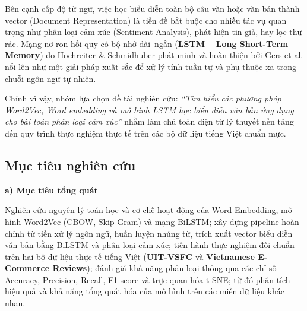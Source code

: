 \documentclass[12pt,a4paper]{article}
\begin{document}
Bên cạnh cấp độ từ ngữ, việc học biểu diễn toàn bộ câu văn hoặc văn bản thành vector (Document Representation) là tiền đề bắt buộc cho nhiều tác vụ quan trọng như phân loại cảm xúc (Sentiment Analysis), phát hiện tin giả, hay lọc thư rác. Mạng nơ-ron hồi quy có bộ nhớ dài--ngắn (\textbf{LSTM -- Long Short-Term Memory}) do Hochreiter \& Schmidhuber phát minh \cite{hochreiter1997lstm} và hoàn thiện bởi Gers et al. \cite{gers2000learning} nổi lên như một giải pháp xuất sắc để xử lý tính tuần tự và phụ thuộc xa trong chuỗi ngôn ngữ tự nhiên. 

Chính vì vậy, nhóm lựa chọn đề tài nghiên cứu: \textit{“Tìm hiểu các phương pháp Word2Vec, Word embedding và mô hình LSTM học biểu diễn văn bản ứng dụng cho bài toán phân loại cảm xúc”} nhằm làm chủ toàn diện từ lý thuyết nền tảng đến quy trình thực nghiệm thực tế trên các bộ dữ liệu tiếng Việt chuẩn mực.

\subsection{Mục tiêu nghiên cứu}\label{sec:muc_tieu_nghien_cuu}

\vspace{0.2cm}\label{sec:muc_tieu_tong_quat}\noindent\textbf{a) Mục tiêu tổng quát}\par
Nghiên cứu nguyên lý toán học và cơ chế hoạt động của Word Embedding, mô hình Word2Vec (CBOW, Skip-Gram) và mạng BiLSTM; xây dựng pipeline hoàn chỉnh từ tiền xử lý ngôn ngữ, huấn luyện nhúng từ, trích xuất vector biểu diễn văn bản bằng BiLSTM và phân loại cảm xúc; tiến hành thực nghiệm đối chuẩn trên hai bộ dữ liệu thực tế tiếng Việt (\textbf{UIT-VSFC} \cite{nguyen2018uit, nguyen2018deep} và \textbf{Vietnamese E-Commerce Reviews}); đánh giá khả năng phân loại thông qua các chỉ số Accuracy, Precision, Recall, F1-score và trực quan hóa t-SNE; từ đó phân tích hiệu quả và khả năng tổng quát hóa của mô hình trên các miền dữ liệu khác nhau.
\end{document}
